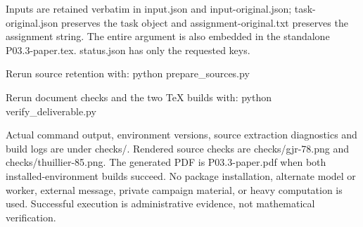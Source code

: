 \documentclass[11pt]{article}
\begin{document}
Inputs are retained verbatim in input.json and input-original.json; task-original.json preserves the task object and assignment-original.txt preserves the assignment string. The entire argument is also embedded in the standalone P03.3-paper.tex. status.json has only the requested keys.

Rerun source retention with: python prepare\_sources.py

Rerun document checks and the two TeX builds with: python verify\_deliverable.py

Actual command output, environment versions, source extraction diagnostics and build logs are under checks/. Rendered source checks are checks/gjr-78.png and checks/thuillier-85.png. The generated PDF is P03.3-paper.pdf when both installed-environment builds succeed. No package installation, alternate model or worker, external message, private campaign material, or heavy computation is used. Successful execution is administrative evidence, not mathematical verification.
\end{document}
